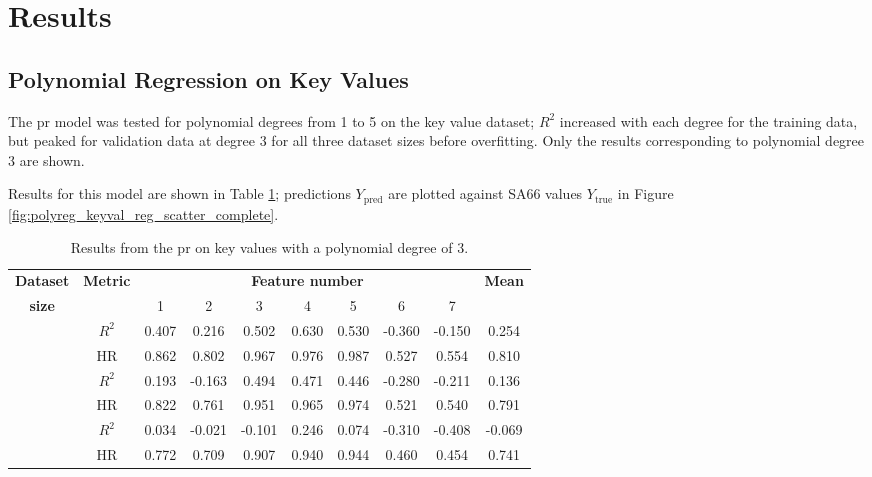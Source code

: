 \section{Results}
\subsection{Polynomial Regression on Key Values} \label{sec:res:polyreg:kvs}
The \ac{pr} model was tested for polynomial degrees from 1 to 5 on the key value dataset; \(R^2\) increased with each degree for the training data, but peaked for validation data at degree 3 for all three dataset sizes before overfitting. Only the results corresponding to polynomial degree 3 are shown.

Results for this model are shown in Table \ref{tab:polyreg:kvs}; predictions \(Y_{\text{pred}}\) are plotted against SA66 values \(Y_{\text{true}}\) in Figure \ref{fig:polyreg_keyval_reg_scatter_complete}.

\begin{table}
    \renewcommand{\arraystretch}{1.4}
    \begin{center}
        \caption{\label{tab:polyreg:kvs} Results from the \ac{pr} on key values with a polynomial degree of 3.}
        \begin{tabular}{ >{\bfseries}c c c c c c c c c c }
            \textbf{Dataset} & \multirow{2}{*}{\textbf{Metric}} & \multicolumn{7}{c}{\textbf{Feature number}} & \multirow{2}{*}{\textbf{Mean}} \\
            size &  & 1 & 2 & 3 & 4 & 5 & 6 & 7 \\
            \midrule
            \multirow{2}{*}{Complete}   & \(R^2\) & 0.407 & 0.216 & 0.502 & 0.630 & 0.530 & -0.360 & -0.150 &    0.254       \\
                                        & HR      & 0.862 & 0.802 & 0.967 & 0.976 & 0.987 & 0.527 & 0.554 &    0.810         \\ \cmidrule{2-10}
            \multirow{2}{*}{Reduced}    & \(R^2\) & 0.193 & -0.163 & 0.494 & 0.471 & 0.446 & -0.280 & -0.211 &   0.136        \\
                                        & HR      & 0.822 & 0.761 & 0.951 & 0.965 & 0.974 & 0.521 & 0.540 &   0.791       \\ \cmidrule{2-10}
            \multirow{2}{*}{Minimal}    & \(R^2\) & 0.034 & -0.021 & -0.101 & 0.246 & 0.074 & -0.310 & -0.408 & -0.069         \\
                                        & HR      & 0.772 & 0.709 & 0.907 & 0.940 & 0.944 & 0.460 & 0.454 &  0.741         \\
        \end{tabular}
    \end{center}
\end{table}


